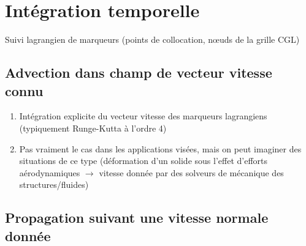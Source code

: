 \section{Intégration temporelle}
Suivi lagrangien de marqueurs (points de collocation, n\oe uds de la grille CGL)

\subsection{Advection dans champ de vecteur vitesse connu}
\begin{enumerate}
	\item Intégration explicite du vecteur vitesse des marqueurs lagrangiens (typiquement Runge-Kutta à l'ordre 4)
	\item Pas vraiment le cas dans les applications visées, mais on peut imaginer des situations de ce type (\eg déformation d'un solide sous l'effet d'efforts aérodynamiques $\to$ vitesse donnée par des solveurs de mécanique des structures/fluides)
\end{enumerate}



\subsection{Propagation suivant une vitesse normale donnée}

